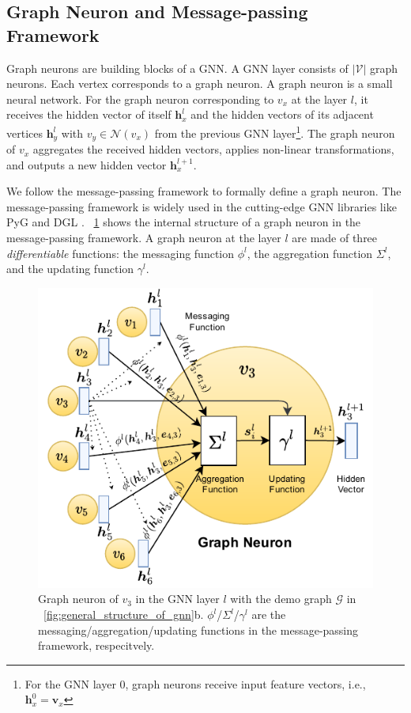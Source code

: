 \subsection{Graph Neuron and Message-passing Framework}

Graph neurons are building blocks of a GNN.
%
A GNN layer consists of $|\mathcal{V}|$ graph neurons.
%
Each vertex corresponds to a graph neuron.
%
A graph neuron is a small neural network.
%
For the graph neuron corresponding to $v_x$ at the layer $l$, it receives the hidden vector of itself $\boldsymbol{h}^l_x$ and the hidden vectors of its adjacent vertices $\boldsymbol{h}^l_y$ with $v_y \in \mathcal{N}(v_x)$ from the previous GNN layer\footnote{For the GNN layer 0, graph neurons receive input feature vectors, i.e., $\boldsymbol{h}^0_x=\boldsymbol{v}_x$}.
%
The graph neuron of $v_x$ aggregates the received hidden vectors, applies non-linear transformations, and outputs a new hidden vector $\boldsymbol{h}_x^{l+1}$.

We follow the message-passing framework \cite{gilmer_messgae_passing} to formally define a graph neuron.
%
The message-passing framework is widely used in the cutting-edge GNN libraries like PyG \cite{PyG} and DGL \cite{DGL}.
%
\figurename~\ref{fig:graph_neuron_structure} shows the internal structure of a graph neuron in the message-passing framework.
%
A graph neuron at the layer $l$ are made of three \emph{differentiable} functions: the messaging function $\phi^l$, the aggregation function $\Sigma^l$, and the updating function $\gamma^l$.

\begin{figure}[h]
    \centering
    \includegraphics[width=0.5\columnwidth]{figs/illustration/GNN_Unit.pdf}
    \caption{Graph neuron of $v_3$ in the GNN layer $l$ with the demo graph $\mathcal{G}$ in \figurename~\ref{fig:general_structure_of_gnn}b. $\phi^l$/$\Sigma^l$/$\gamma^l$ are the messaging/aggregation/updating functions in the message-passing framework, respecitvely.}
    \label{fig:graph_neuron_structure}
\end{figure}

